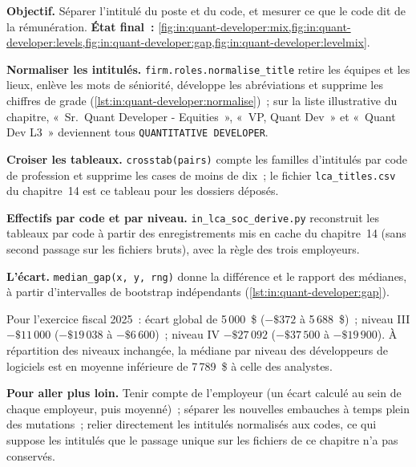 \begin{tutorial}
\textbf{Objectif.} Séparer l'intitulé du poste et du code, et mesurer ce que le code dit de la rémunération.
\textbf{État final~:} \cref{fig:in:quant-developer:mix,fig:in:quant-developer:levels,fig:in:quant-developer:gap,fig:in:quant-developer:levelmix}.
\begin{tutsteps}
\item \textbf{Normaliser les intitulés.} \texttt{firm.roles.normalise\_title} retire les équipes et les lieux, enlève les mots de séniorité,
développe les abréviations et supprime les chiffres de grade (\cref{lst:in:quant-developer:normalise})~; sur la liste illustrative du chapitre,
«~Sr.\ Quant Developer - Equities~», «~VP, Quant Dev~» et «~Quant Dev L3~» deviennent
tous \texttt{QUANTITATIVE DEVELOPER}.
\label{lst:in:quant-developer:normalise}
\item \textbf{Croiser les tableaux.} \texttt{crosstab(pairs)} compte les familles d'intitulés par code de profession et supprime les cases
de moins de dix~; le fichier \texttt{lca\_titles.csv} du chapitre~14 est ce tableau pour les dossiers déposés.
\item \textbf{Effectifs par code et par niveau.} \texttt{in\_lca\_soc\_derive.py} reconstruit les tableaux par code à partir des enregistrements
mis en cache du chapitre~14 (sans second passage sur les fichiers bruts), avec la règle des trois employeurs.
\item \textbf{L'écart.} \texttt{median\_gap(x, y, rng)} donne la différence et le rapport des médianes, à partir d'intervalles de
bootstrap indépendants (\cref{lst:in:quant-developer:gap}).
\label{lst:in:quant-developer:gap}
\end{tutsteps}
\end{tutorial}

Pour l'exercice fiscal 2025~: écart global de 5\,000~\$ ($-\$372$ à 5\,688~\$)~; niveau III $-\$11\,000$ ($-\$19\,038$ à $-\$6\,600$)~; niveau
IV $-\$27\,092$ ($-\$37\,500$ à $-\$19\,900$). À répartition des niveaux inchangée, la médiane par niveau des développeurs de logiciels
est en moyenne inférieure de 7\,789~\$ à celle des analystes.

\textbf{Pour aller plus loin.} Tenir compte de l'employeur (un écart calculé au sein de chaque employeur, puis moyenné)~; séparer
les nouvelles embauches à temps plein des mutations~; relier directement les intitulés normalisés aux codes, ce qui suppose les intitulés que
le passage unique sur les fichiers de ce chapitre n'a pas conservés.

